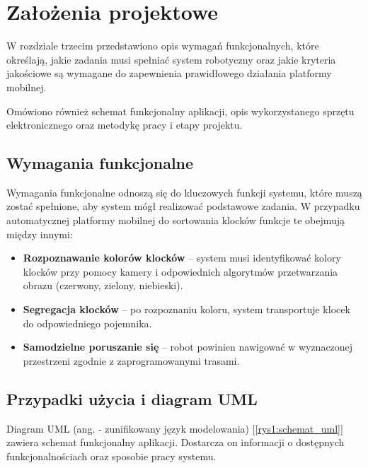 \chapter{Założenia projektowe}
\label{ch:zalozenia-wstepne}

W rozdziale trzecim przedstawiono opis wymagań funkcjonalnych, które określają, jakie zadania musi spełniać system robotyczny oraz jakie kryteria jakościowe są wymagane do zapewnienia prawidłowego działania platformy mobilnej. 

Omówiono również schemat funkcjonalny aplikacji, opis wykorzystanego sprzętu elektronicznego oraz metodykę pracy i etapy projektu.
 

\section{Wymagania funkcjonalne}
Wymagania funkcjonalne odnoszą się do kluczowych funkcji systemu, które muszą zostać spełnione, aby system mógł realizować podstawowe zadania. W przypadku automatycznej platformy mobilnej do sortowania klocków funkcje te obejmują między innymi:
\begin{itemize}
    \item \textbf{Rozpoznawanie kolorów klocków} – system musi identyfikować kolory klocków przy pomocy kamery i odpowiednich algorytmów przetwarzania obrazu (czerwony, zielony, niebieski).
    \item \textbf{Segregacja klocków} – po rozpoznaniu koloru, system transportuje klocek do odpowiedniego pojemnika.
    \item \textbf{Samodzielne poruszanie się} – robot powinien nawigować w wyznaczonej przestrzeni zgodnie z zaprogramowanymi trasami.
\end{itemize}

\section{Przypadki użycia i diagram UML}

Diagram UML (ang.  - zunifikowany język modelowania) [\ref{rys1:schemat_uml}] zawiera schemat funkcjonalny aplikacji. Dostarcza on informacji o dostępnych funkcjonalnościach oraz sposobie pracy systemu.

